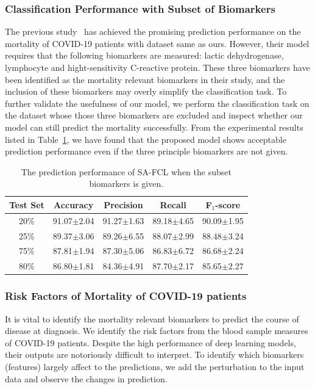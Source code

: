 \subsubsection{Classification Performance with Subset of Biomarkers}
The previous study~\cite{yan2020interpretable} has achieved the promising prediction performance on the mortality of COVID-19 patients with dataset same as ours. However, their model requires that the following biomarkers are measured: lactic dehydrogenase, lymphocyte and hight-sensitivity C-reactive protein. These three biomarkers have been identified as the mortality relevant biomarkers in their study, and the inclusion of these biomarkers may overly simplify the classification task. To further validate the usefulness of our model, we perform the classification task on the dataset whose those three biomarkers are excluded and inspect whether our model can still predict the mortality successfully. From the experimental results listed in Table~\ref{tab: experimetal results with the subset of biomarkers}, we have found that the proposed model shows acceptable prediction performance even if the three principle biomarkers are not given.
\begin{table}[h]
    \centering
    \caption{The prediction performance of SA-FCL when the subset biomarkers is given.}
    \begin{tabular}{ccccc}
    \toprule
    {\bfseries Test Set}  & {\bfseries Accuracy} & {\bfseries Precision} & {\bfseries Recall} & {\bfseries F$_1$-score} \\
    \midrule
    20\%  & 91.07$\pm$2.04  & 91.27$\pm$1.63  &89.18$\pm$4.65  &90.09$\pm$1.95  \\
    25\%  & 89.37$\pm$3.06  & 89.26$\pm$6.55  &88.07$\pm$2.99  &88.48$\pm$3.24  \\
    75\%  & 87.81$\pm$1.94  & 87.30$\pm$5.06  &86.83$\pm$6.72  &86.68$\pm$2.24  \\
    80\%  & 86.80$\pm$1.81  & 84.36$\pm$4.91  &87.70$\pm$2.17  &85.65$\pm$2.27  \\
    \bottomrule
    \end{tabular}
    \label{tab: experimetal results with the subset of biomarkers}
\end{table}

\subsubsection{Risk Factors of Mortality of COVID-19 patients}
It is vital to identify the mortality relevant biomarkers to predict the course of disease at diagnosis. We identify the risk factors from the blood sample measures of COVID-19 patients. Despite the high performance of deep learning models, their outputs are notoriously difficult to interpret. To identify which biomarkers (features) largely affect to the predictions, we add the perturbation to the input data and observe the changes in prediction.

